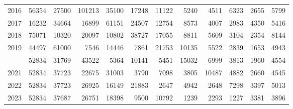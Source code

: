 \documentclass[
]{article}
\begin{document}
\begin{longtable}[t]{lrrrrrrrrrrr}
2016 & 56354 & 27500 & 101213 & 35100 & 17248 & 11122 & 5240 & 4511 & 6323 & 2655 & 5799\\
2017 & 16232 & 34664 & 16899 & 61151 & 24507 & 12754 & 8573 & 4007 & 2983 & 4350 & 5416\\
2018 & 75071 & 10320 & 20097 & 10802 & 38727 & 17055 & 8811 & 5609 & 3104 & 2354 & 8144\\
2019 & 44497 & 61000 & 7546 & 14446 & 7861 & 21753 & 10135 & 5522 & 2839 & 1653 & 4943\\
\addlinespace
2020 & 52834 & 31769 & 43522 & 5364 & 10141 & 5451 & 15032 & 6999 & 3813 & 1960 & 4554\\
2021 & 52834 & 37723 & 22675 & 31003 & 3790 & 7098 & 3805 & 10487 & 4882 & 2660 & 4545\\
2022 & 52834 & 37723 & 26925 & 16149 & 21883 & 2647 & 4942 & 2648 & 7298 & 3397 & 5013\\
2023 & 52834 & 37687 & 26751 & 18398 & 9500 & 10792 & 1239 & 2293 & 1227 & 3381 & 3896\\*
\end{longtable}
\end{document}
